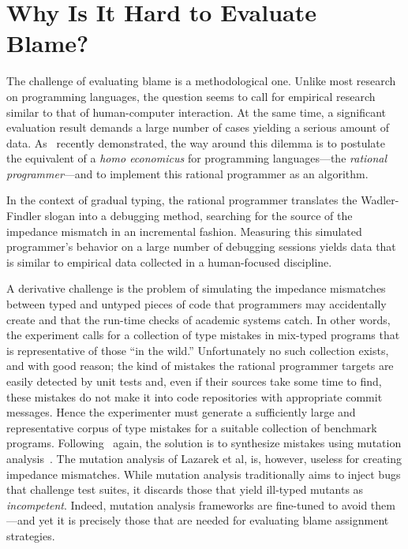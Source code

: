 
\section{Why Is It Hard to Evaluate Blame?}
\label{sec:challenges}


The challenge of evaluating blame is a methodological one. Unlike most research
on programming languages, the question seems to call for empirical research
similar to that of human-computer interaction. At the same time, a significant
evaluation result demands a large number of cases yielding a serious amount of
data. As~\citet{lksfd-popl-2020} recently demonstrated, the way around this
dilemma is to postulate the equivalent of a {\it homo economicus\/} for
programming languages---the {\em rational programmer\/}---and to implement this
rational programmer as an algorithm.

In the context of gradual typing, the rational programmer translates the
Wadler-Findler slogan into a debugging method, searching for the source of the
impedance mismatch in an incremental fashion. Measuring this simulated
programmer's behavior on a large number of debugging sessions yields data that
is similar to empirical data collected in a human-focused discipline.

A derivative challenge is the problem of simulating the impedance mismatches
between typed and untyped pieces of code that programmers may accidentally create
and that the run-time checks of academic systems catch. In other words, the
experiment calls for a collection of type mistakes in mix-typed programs that is
representative of those ``in the wild.'' Unfortunately no such collection exists,
and with good reason; the kind of mistakes the rational programmer targets are
easily detected by unit tests and, even if their sources take some time to find,
these mistakes do not make it into code repositories with appropriate commit
messages.  Hence the experimenter must generate a sufficiently large and
representative corpus of type mistakes for a suitable collection of benchmark
programs.  Following~\citet{lksfd-popl-2020} again, the solution is to synthesize
mistakes using mutation analysis~\cite{lipton1971fault, demillo1978hints,
jia2011analysis}.  The mutation analysis of Lazarek et al, is, however, useless
for creating impedance mismatches.  While mutation analysis traditionally aims to
inject bugs that challenge test suites, it discards those that yield ill-typed
mutants as \emph{incompetent}.  Indeed, mutation analysis frameworks are
fine-tuned to avoid them---and yet it is precisely those that are needed for
evaluating blame assignment strategies.

